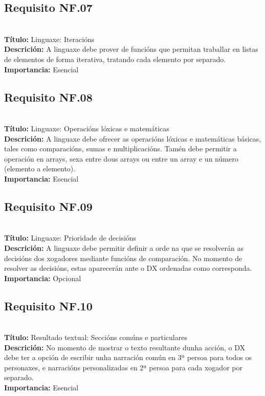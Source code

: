 \subsection{Requisito NF.07}~\\
{\bf Título:} Linguaxe: Iteracións\\
{\bf Descrición:} A linguaxe debe prover de funcións que permitan traballar en
listas de elementos de forma iterativa, tratando cada elemento por separado.\\
{\bf Importancia:} Esencial

\subsection{Requisito NF.08}~\\
{\bf Título:} Linguaxe: Operacións lóxicas e matemáticas\\
{\bf Descrición:} A linguaxe debe ofrecer as operacións lóxicas e matemáticas
básicas, tales como comparacións, sumas e multiplicacións. Tamén debe permitir
a operación en arrays, sexa entre dous arrays ou entre un array e un número
(elemento a elemento).\\
{\bf Importancia:} Esencial

\subsection{Requisito NF.09}~\\
{\bf Título:} Linguaxe: Prioridade de decisións\\
{\bf Descrición:} A linguaxe debe permitir definir a orde na que se resolverán
as decisións dos xogadores mediante funcións de comparación. No momento de
resolver as decisións, estas aparecerán ante o DX ordenadas como corresponda.\\
{\bf Importancia:} Opcional

\subsection{Requisito NF.10}~\\
{\bf Título:} Resultado textual: Seccións comúns e particulares\\
{\bf Descrición:} No momento de mostrar o texto resultante dunha acción, o DX
debe ter a opción de escribir unha narración común en 3ª persoa para todos os
personaxes, e narracións personalizadas en 2ª persoa para cada xogador por separado.\\
{\bf Importancia:} Esencial

